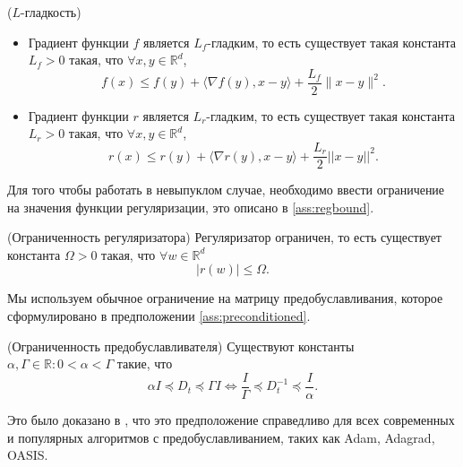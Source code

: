 \begin{assumption}{($L$-гладкость)} 
\label{ass:smoothness}
\begin{itemize}
    \item 	Градиент функции $f$ является $L_f$-гладким, то есть существует такая константа $L_f > 0$ такая, что $\forall x, y \in \mathbb{R}^d$,
    	\begin{equation*}
    		f(x) \leq f(y) + \langle \nabla f(y), x-y \rangle + \frac{L_f}{2} \|x - y\|^2.
    	\end{equation*}
    \item    Градиент функции $r$ является $L_r$-гладким, то есть существует такая константа $L_r > 0$ такая, что $\forall x, y \in \mathbb{R}^d$,
	\begin{equation*}
		r(x) \leq r(y) + \langle \nabla r(y), x-y \rangle + \frac{L_r}{2} ||x - y||^2.
	\end{equation*}
\end{itemize}
\end{assumption}

Для того чтобы работать в невыпуклом случае, необходимо ввести ограничение на значения функции регуляризации, это описано в \ref{ass:regbound}.

\begin{assumption}{(Ограниченность регуляризатора)}
\label{ass:regbound}
Регуляризатор ограничен, то есть существует константа $\Omega > 0$ такая, что $\forall w \in \mathbb{R}^d$ 
\begin{equation*}
|r(w)| \le \Omega.
\end{equation*}
\end{assumption}

Мы используем обычное ограничение на матрицу предобуславливания, которое сформулировано в предположении \ref{ass:preconditioned}.

\begin{assumption}{(Ограниченность предобуславливателя)}
\label{ass:preconditioned}
Существуют константы $\alpha, \Gamma \in \mathbb{R} : 0 < \alpha < \Gamma$ такие, что
\begin{equation*}
\alpha I \preccurlyeq D_t \preccurlyeq \Gamma I \Leftrightarrow \frac{I}{\Gamma} \preccurlyeq D_t^{-1} \preccurlyeq \frac{I}{\alpha}.
\end{equation*}
\end{assumption}

Это было доказано в \citep{beznosikov2022scaled}, что это предположение справедливо для всех современных и популярных алгоритмов с предобуславливанием, таких как Adam, Adagrad, OASIS.


